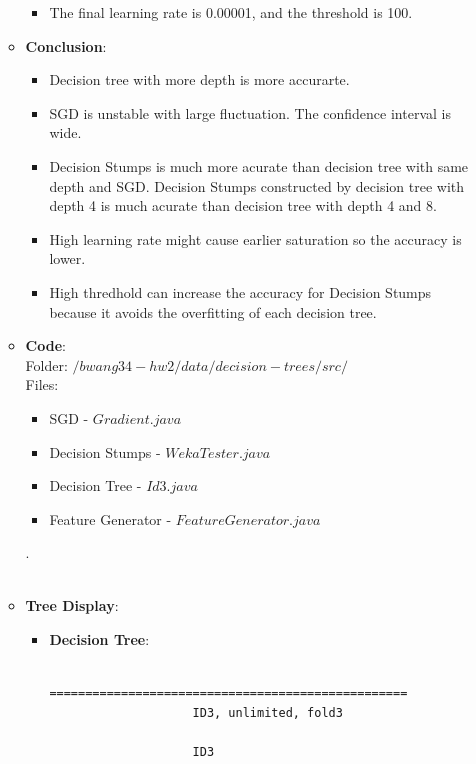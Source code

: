 \begin{enumerate}
\begin{itemize}
\begin{table}[h]
			\end{table}
			\begin{itemize}
				\item The final learning rate is 0.00001, and the threshold is 100.\\
			\end{itemize}
		\item \textbf{Conclusion}:
			\begin{itemize}
			\item Decision tree with more depth is more accurarte.
			\item SGD is unstable with large fluctuation. The confidence interval is wide.
			\item Decision Stumps is much more acurate than decision tree with same depth and SGD. Decision Stumps constructed by decision tree with depth 4 is much acurate than decision tree with depth 4 and 8.
			\item High learning rate might cause earlier saturation so the accuracy is lower.
			\item High thredhold can increase the accuracy for Decision Stumps because it avoids the overfitting of each decision tree.\\
			\end{itemize}
		\item \textbf{Code}:\\
			Folder: $/bwang34-hw2/data/decision-trees/src/$\\
			Files:
				\begin{itemize}
					\item SGD - $Gradient.java$
					\item Decision Stumps - $WekaTester.java$
					\item Decision Tree - $Id3.java$
					\item Feature Generator - $FeatureGenerator.java$
				\end{itemize}
			.\\\\
		\item \textbf{Tree Display}:
			\begin{itemize}
				\item \textbf{Decision Tree}: \\
					\begin{verbatim}
					==================================================
					ID3, unlimited, fold3

					ID3


\end{verbatim}
\end{itemize}
\end{itemize}
\end{enumerate}
